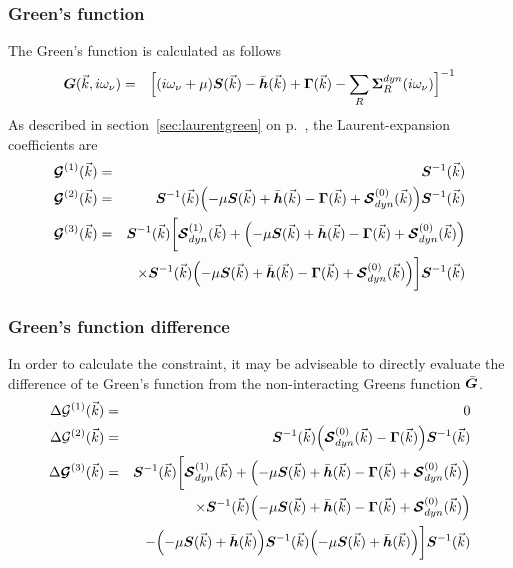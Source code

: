 \documentclass[11pt,a4paper]{report}
\begin{document}
\subsubsection{Green's function}
The Green's function is calculated as follows
\begin{eqnarray}
\bm{G}(\vec{k},i\omega_\nu)&=&
\Bigl[
(i\omega_\nu+\mu)\bm{S}(\vec{k})-\bar{\bm{h}}(\vec{k})+\bm{\Gamma}(\vec{k})
-\sum_R\bm{\Sigma}^{dyn}_R(i\omega_\nu)
\Bigr]^{-1}
\end{eqnarray}
As described in section~\ref{sec:laurentgreen} on
p.~\pageref{sec:laurentgreen}, the Laurent-expansion coefficients are
\begin{eqnarray}
\mat{\mathcal{G}}^{(1)}(\vec{k})&=&\mat{S}^{-1}(\vec{k})
%
\nonumber\\
\mat{\mathcal{G}}^{(2)}(\vec{k})&=&\mat{S}^{-1}(\vec{k})
\Bigl(-\mu\mat{S}(\vec{k})+\bar{\mat{h}}(\vec{k})-\mat{\Gamma}(\vec{k})
+\mat{\mathcal{S}}^{(0)}_{dyn}(\vec{k})
\Bigr)
\mat{S}^{-1}(\vec{k})
%
\nonumber\\
\mat{\mathcal{G}}^{(3)}(\vec{k})&=&
\mat{S}^{-1}(\vec{k})
\biggl[
\mat{\mathcal{S}}^{(1)}_{dyn}(\vec{k})+
\Bigl(-\mu\mat{S}(\vec{k})+\bar{\mat{h}}(\vec{k})-\mat{\Gamma}(\vec{k})
+\mat{\mathcal{S}}^{(0)}_{dyn}(\vec{k})\Bigr)
\nonumber\\
&&\times\mat{S}^{-1}(\vec{k})
\Bigl(-\mu\mat{S}(\vec{k})+\bar{\mat{h}}(\vec{k})-\mat{\Gamma}(\vec{k})
+\mat{\mathcal{S}}^{(0)}_{dyn}(\vec{k})\Bigr)
\biggr]
\mat{S}^{-1}(\vec{k})
\nonumber\\
\end{eqnarray}
%
\subsubsection{Green's function difference}
In order to calculate the constraint, it may be adviseable to directly
evaluate the difference of te Green's function from the
non-interacting Greens function $\bar{\bm{G}}$.
\begin{eqnarray}
\Delta\mathcal{G}^{(1)}(\vec{k})&=&0
\nonumber\\
\Delta\mathcal{G}^{(2)}(\vec{k})&=&\mat{S}^{-1}(\vec{k})
\Bigl(
\mat{\mathcal{S}}^{(0)}_{dyn}(\vec{k})-\mat{\Gamma}(\vec{k})
\Bigr)
\mat{S}^{-1}(\vec{k})
%
\nonumber\\
\Delta\mat{\mathcal{G}}^{(3)}(\vec{k})
&=&
\mat{S}^{-1}(\vec{k})
\biggl[
\mat{\mathcal{S}}^{(1)}_{dyn}(\vec{k})+
\Bigl(-\mu\mat{S}(\vec{k})+\bar{\mat{h}}(\vec{k})-\mat{\Gamma}(\vec{k})
+\mat{\mathcal{S}}^{(0)}_{dyn}(\vec{k})\Bigr)
\nonumber\\
&&\times\mat{S}^{-1}(\vec{k})
\Bigl(-\mu\mat{S}(\vec{k})+\bar{\mat{h}}(\vec{k})-\mat{\Gamma}(\vec{k})
+\mat{\mathcal{S}}^{(0)}_{dyn}(\vec{k})\Bigr)
\nonumber\\
&&-
\Bigl(-\mu\mat{S}(\vec{k})+\bar{\mat{h}}(\vec{k})\Bigr)
\mat{S}^{-1}(\vec{k})
\Bigl(-\mu\mat{S}(\vec{k})+\bar{\mat{h}}(\vec{k})\Bigr)
\biggr]
\mat{S}^{-1}(\vec{k})
\end{eqnarray}
\end{document}
